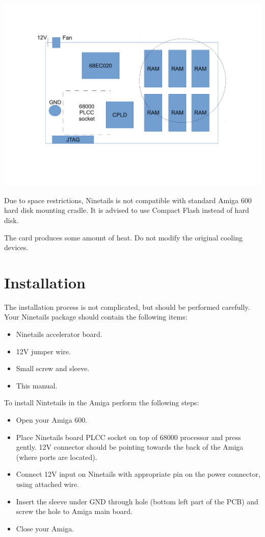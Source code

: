 \documentclass[10pt,a5paper]{article}
\begin{document}
\begin{center}
\includegraphics[scale=0.25]{ninetails-drawing.pdf}
\end{center}

Due to space restrictions, Ninetails is not compatible with standard Amiga 600 hard disk mounting cradle. It is advised to use Compact Flash instead of hard disk. 

The card produces some amount of heat. Do not modify the original cooling devices.

\section*{Installation}

The installation process is not complicated, but should be performed carefully. Your Ninetails package should contain the following items:

\begin{itemize}
	\item Ninetails accelerator board.
	\item 12V jumper wire.
	\item Small screw and sleeve.
	\item This manual.
\end{itemize}

To install Nintetails in the Amiga perform the following steps:

\begin{itemize}
	\item Open your Amiga 600.
	\item Place Ninetails board PLCC socket on top of 68000 processor and press gently. 12V connector should be pointing towards the back of the Amiga (where ports are located).
	\item Connect 12V input on Ninetails with appropriate pin on the power connector, using attached wire.
	\item Insert the sleeve under GND through hole (bottom left part of the PCB) and screw the hole to Amiga main board.
	\item Close your Amiga.
\end{itemize}
\end{document}
